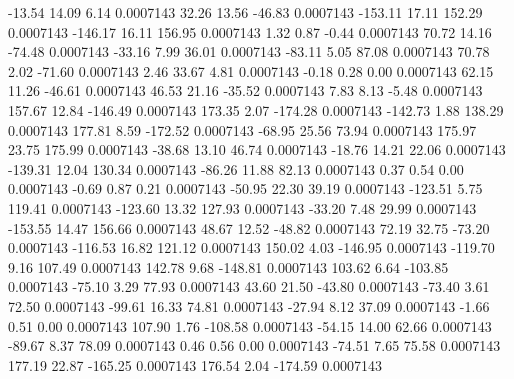       -13.54       14.09        6.14     0.0007143
       32.26       13.56      -46.83     0.0007143
     -153.11       17.11      152.29     0.0007143
     -146.17       16.11      156.95     0.0007143
        1.32        0.87       -0.44     0.0007143
       70.72       14.16      -74.48     0.0007143
      -33.16        7.99       36.01     0.0007143
      -83.11        5.05       87.08     0.0007143
       70.78        2.02      -71.60     0.0007143
        2.46       33.67        4.81     0.0007143
       -0.18        0.28        0.00     0.0007143
       62.15       11.26      -46.61     0.0007143
       46.53       21.16      -35.52     0.0007143
        7.83        8.13       -5.48     0.0007143
      157.67       12.84     -146.49     0.0007143
      173.35        2.07     -174.28     0.0007143
     -142.73        1.88      138.29     0.0007143
      177.81        8.59     -172.52     0.0007143
      -68.95       25.56       73.94     0.0007143
      175.97       23.75      175.99     0.0007143
      -38.68       13.10       46.74     0.0007143
      -18.76       14.21       22.06     0.0007143
     -139.31       12.04      130.34     0.0007143
      -86.26       11.88       82.13     0.0007143
        0.37        0.54        0.00     0.0007143
       -0.69        0.87        0.21     0.0007143
      -50.95       22.30       39.19     0.0007143
     -123.51        5.75      119.41     0.0007143
     -123.60       13.32      127.93     0.0007143
      -33.20        7.48       29.99     0.0007143
     -153.55       14.47      156.66     0.0007143
       48.67       12.52      -48.82     0.0007143
       72.19       32.75      -73.20     0.0007143
     -116.53       16.82      121.12     0.0007143
      150.02        4.03     -146.95     0.0007143
     -119.70        9.16      107.49     0.0007143
      142.78        9.68     -148.81     0.0007143
      103.62        6.64     -103.85     0.0007143
      -75.10        3.29       77.93     0.0007143
       43.60       21.50      -43.80     0.0007143
      -73.40        3.61       72.50     0.0007143
      -99.61       16.33       74.81     0.0007143
      -27.94        8.12       37.09     0.0007143
       -1.66        0.51        0.00     0.0007143
      107.90        1.76     -108.58     0.0007143
      -54.15       14.00       62.66     0.0007143
      -89.67        8.37       78.09     0.0007143
        0.46        0.56        0.00     0.0007143
      -74.51        7.65       75.58     0.0007143
      177.19       22.87     -165.25     0.0007143
      176.54        2.04     -174.59     0.0007143
